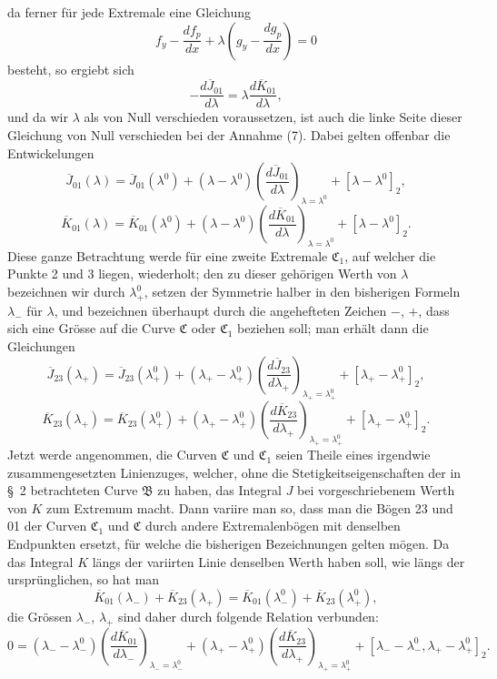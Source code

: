 \documentclass[11pt,a4paper,leqno]{article}
\begin{document}
da ferner für jede Extremale eine Gleichung
\[
f_y-\frac{df_p}{dx}+\lambda\left(g_y-\frac{dg_p}{dx}\right)=0
\]
besteht, so ergiebt sich
\begin{equation}\tag{9}
-\frac{d\overline{J}_{01}}{d\lambda}=\lambda\frac{d\overline{K}_{01}}{d\lambda},
\end{equation}
und da wir $\lambda$ als von Null verschieden voraussetzen, ist auch die linke Seite dieser Gleichung von Null verschieden bei der Annahme (7). Dabei gelten offenbar die Entwickelungen
\[
\overline{J}_{01}(\lambda)=\overline{J}_{01}(\lambda^0)+(\lambda-\lambda^0)\left(\frac{d\overline{J}_{01}}{d\lambda}\right)_{\lambda=\lambda^0}+[\lambda-\lambda^0]_2,
\]
\[
\overline{K}_{01}(\lambda)=\overline{K}_{01}(\lambda^0)+(\lambda-\lambda^0)\left(\frac{d\overline{K}_{01}}{d\lambda}\right)_{\lambda=\lambda^0}+[\lambda-\lambda^0]_2.
\]
Diese ganze Betrachtung werde für eine zweite Extremale $\mathfrak{C}_1$, auf welcher die Punkte 2 und 3 liegen, wiederholt; den zu dieser gehörigen Werth von $\lambda$ bezeichnen wir durch $\lambda_+^0$, setzen der Symmetrie halber in den bisherigen Formeln $\lambda_-$ für $\lambda$, und bezeichnen überhaupt durch die angehefteten Zeichen $-$, $+$, dass sich eine Grösse auf die Curve $\mathfrak{C}$ oder $\mathfrak{C}_1$ beziehen soll; man erhält dann die Gleichungen
\[
\overline{J}_{23}(\lambda_+)=\overline{J}_{23}(\lambda_+^0)+
(\lambda_+-\lambda_+^0)\left(\frac{d\overline{J}_{23}}{d\lambda_+}\right)_{\lambda_+=\lambda_+^0}
+[\lambda_+-\lambda_+^0]_2,
\]
\[
\overline{K}_{23}(\lambda_+)=\overline{K}_{23}(\lambda_+^0)+
(\lambda_+-\lambda_+^0)\left(\frac{d\overline{K}_{23}}{d\lambda_+}\right)_{\lambda_+=\lambda_+^0}
+[\lambda_+-\lambda_+^0]_2.
\]
Jetzt werde angenommen, die Curven $\mathfrak{C}$ und $\mathfrak{C}_1$ seien Theile eines irgendwie zusammengesetzten Linienzuges, welcher, ohne die Stetigkeitseigenschaften der in \S~2 betrachteten Curve $\mathfrak{B}$ zu haben, das Integral $J$ bei vorgeschriebenem Werth von $K$ zum Extremum macht. Dann variire man so, dass man die Bögen 23 und 01 der Curven $\mathfrak{C}_1$ und $\mathfrak{C}$ durch andere Extremalenbögen mit denselben Endpunkten ersetzt, für welche die bisherigen Bezeichnungen gelten mögen. Da das Integral $K$ längs der variirten Linie denselben Werth haben soll, wie längs der ursprünglichen, so hat man
\[
\overline{K}_{01}(\lambda_-)+\overline{K}_{23}(\lambda_+)
=\overline{K}_{01}(\lambda_-^0)+\overline{K}_{23}(\lambda_+^0),
\]
die Grössen $\lambda_-$, $\lambda_+$ sind daher durch folgende Relation verbunden:
\[
0=(\lambda_- -\lambda_-^0)\left(\frac{d\overline{K}_{01}}{d\lambda_-}\right)_{\lambda_- =\lambda_-^0}
+(\lambda_+ -\lambda_+^0)\left(\frac{d\overline{K}_{23}}{d\lambda_+}\right)_{\lambda_+ =\lambda_+^0}
+[\lambda_- -\lambda_-^0,\lambda_+ -\lambda_+^0]_2.
\]
\end{document}
